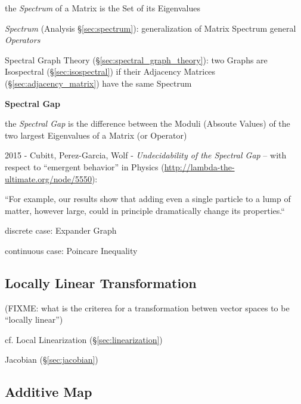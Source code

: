 the \emph{Spectrum} of a Matrix is the Set of its Eigenvalues

\fist \emph{Spectrum} (Analysis \S\ref{sec:spectrum}): generalization of Matrix
Spectrum general \emph{Operators}

\fist Spectral Graph Theory (\S\ref{sec:spectral_graph_theory}): two Graphs are
Isospectral (\S\ref{sec:isospectral}) if their Adjacency Matrices
(\S\ref{sec:adjacency_matrix}) have the same Spectrum


\textbf{Spectral Gap}

the \emph{Spectral Gap} is the difference between the Moduli (Absoute Values) of
the two largest Eigenvalues of a Matrix (or Operator)

2015 - Cubitt, Perez-Garcia, Wolf - \emph{Undecidability of the Spectral Gap} --
with respect to ``emergent behavior'' in Physics
(\url{http://lambda-the-ultimate.org/node/5550}):

``For example, our results show that adding even a single particle to a lump of
matter, however large, could in principle dramatically change its properties.``

discrete case: Expander Graph

continuous case: Poincare Inequality



\subsection{Locally Linear Transformation}\label{sec:locally_linear}


(FIXME: what is the criterea for a transformation betwen vector spaces to be
``locally linear'')

\fist cf. Local Linearization (\S\ref{sec:linearization})

\fist Jacobian (\S\ref{sec:jacobian})



\subsection{Additive Map}\label{sec:additive_map}

